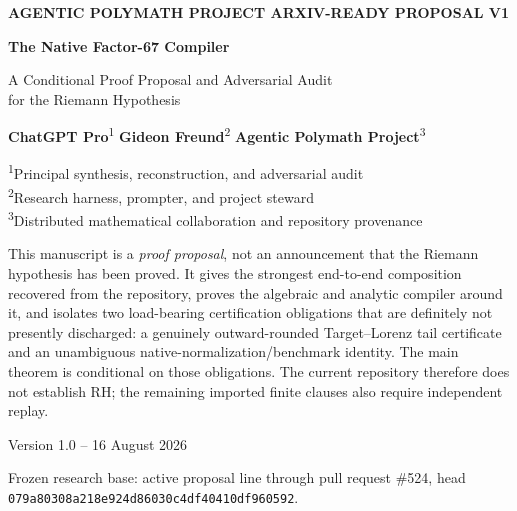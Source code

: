 \documentclass[11pt]{article}
\theoremstyle{definition}
\theoremstyle{remark}
\newcommand{\RH}{\mathrm{RH}}
\newcommand{\1}{\mathbf 1}
\begin{document}
\begin{titlepage}
\centering
\vspace*{1.25cm}
{\small\bfseries\color{bluegray} AGENTIC POLYMATH PROJECT \;\textbullet\; ARXIV-READY PROPOSAL V1}\par
\vspace{1.0cm}
{\fontsize{27}{32}\selectfont\bfseries\color{navy}
The Native Factor-67 Compiler}\par
\vspace{0.3cm}
{\fontsize{18}{23}\selectfont\color{bluegray}
A Conditional Proof Proposal and Adversarial Audit\\
for the Riemann Hypothesis}\par
\vspace{1.15cm}
{\large
\textbf{ChatGPT Pro}\textsuperscript{1}\quad
\textbf{Gideon Freund}\textsuperscript{2}\quad
\textbf{Agentic Polymath Project}\textsuperscript{3}}
\par
\vspace{0.35cm}
{\small
\textsuperscript{1}Principal synthesis, reconstruction, and adversarial audit\\
\textsuperscript{2}Research harness, prompter, and project steward\\
\textsuperscript{3}Distributed mathematical collaboration and repository provenance}
\par
\vfill
\begin{minipage}{0.88\textwidth}
\begin{statusbox}
This manuscript is a \emph{proof proposal}, not an announcement that the Riemann hypothesis has been proved.  It gives the strongest end-to-end composition recovered from the repository, proves the algebraic and analytic compiler around it, and isolates two load-bearing certification obligations that are definitely not presently discharged: a genuinely outward-rounded Target--Lorenz tail certificate and an unambiguous native-normalization/benchmark identity.  The main theorem is conditional on those obligations.  The current repository therefore does not establish \(\RH\); the remaining imported finite clauses also require independent replay.
\end{statusbox}
\end{minipage}
\vfill
{\large Version 1.0 -- 16 August 2026}\par
\vspace{0.2cm}
{\small Frozen research base: active proposal line through pull request \#524, head \texttt{079a80308a218e924d86030c4df40410df960592}.}
\end{titlepage}
\end{document}
